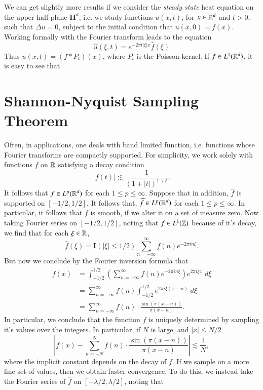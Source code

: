 We can get slightly more results if we consider the \emph{steady state} heat equation on the upper half plane $\mathbf{H}^d$, i.e. we study functions $u(x,t)$, for $x \in \operatorname{\mathbb{R}}^d$ and $t > 0$, such that $\Delta u = 0$, subject to the initial condition that $u(x,0) = f(x)$. Working formally with the Fourier transform leads to the equation
%
\[ \widehat{u}(\xi,t) = e^{-2 \pi t |\xi| x} \widehat{f}(\xi) \]
%
Thus $u(x,t) = (f * P_t)(x)$, where $P_t$ is the Poisson kernel. If $f \in L^1(\operatorname{\mathbb{R}}^d)$, it is easy to see that 


\section{Shannon-Nyquist Sampling Theorem}

Often, in applications, one deals with band limited function, i.e. functions whose Fourier transforms are compactly supported. For simplicity, we work solely with functions $f$ on $\operatorname{\mathbb{R}}$ satisfying a decay condition
%
\[ |f(t)| \lesssim \frac{1}{(1 + |t|)^{1 + \delta}}. \]
%
It follows that $f \in L^p(\operatorname{\mathbb{R}}^d)$ for each $1 \leq p \leq \infty$. Suppose that in addition, $\widehat{f}$ is supported on $[-1/2,1/2]$. It follows that, $\widehat{f} \in L^p(\operatorname{\mathbb{R}}^d)$ for each $1 \leq p \leq \infty$. In particular, it follows that $f$ is smooth, if we alter it on a set of measure zero. Now taking Fourier series on $[-1/2,1/2]$, noting that $f \in L^1(\operatorname{\mathbb{Z}})$ because of it's decay, we find that for each $\xi \in \operatorname{\mathbb{R}}$,
%
\[ \widehat{f}(\xi) = \mathbf{I}(|\xi| \leq 1/2) \sum_{n = -\infty}^\infty f(n) e^{-2 \pi i n \xi}. \]
%
But now we conclude by the Fourier inversion formula that
%
\begin{align*}
    f(x) &= \int_{-1/2}^{1/2} \left( \sum_{n = -\infty}^\infty f(n) e^{-2 \pi i n \xi} \right) e^{2 \pi i \xi x}\; d\xi\\
    &= \sum_{n = -\infty}^\infty f(n) \int_{-1/2}^{1/2} e^{2 \pi i \xi (x-n)}\; d\xi\\
    &= \sum_{n = -\infty}^\infty f(n) \cdot \frac{\sin(\pi (x - n))}{\pi (x-n)}.
\end{align*}
%
In particular, we conclude that the function $f$ is uniquely determined by sampling it's values over the integers. In particular, if $N$ is large, and $|x| \leq N/2$
%
\[ \left| f(x) - \sum_{n = -N}^N f(n) \cdot \frac{\sin(\pi(x - n))}{\pi (x - n)} \right| \lesssim \frac{1}{N}, \]
%
where the implicit constant depends on the decay of $f$. If we sample on a more fine set of values, then we obtain faster convergence. To do this, we instead take the Fourier series of $\widehat{f}$ on $[-\lambda/2,\lambda/2]$, noting that
